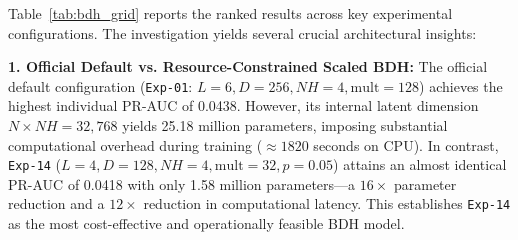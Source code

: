\documentclass[oneside]{ieeeaccess}
\begin{document}
Table~\ref{tab:bdh_grid} reports the ranked results across key experimental configurations. The investigation yields several crucial architectural insights:

\begin{table}[!t]
\caption{Systematic BDH Hyperparameter Grid Exploration Ranked by Test PR-AUC}
\label{tab:bdh_grid}
\centering
{}
\end{table}

\textbf{1. Official Default vs. Resource-Constrained Scaled BDH:} The official default configuration (\texttt{Exp-01}: $L=6, D=256, NH=4, \mathrm{mult}=128$) achieves the highest individual PR-AUC of 0.0438. However, its internal latent dimension $N \times NH = 32,768$ yields 25.18 million parameters, imposing substantial computational overhead during training ($\approx 1820$ seconds on CPU). In contrast, \texttt{Exp-14} ($L=4, D=128, NH=4, \mathrm{mult}=32, p=0.05$) attains an almost identical PR-AUC of 0.0418 with only 1.58 million parameters—a $16\times$ parameter reduction and a $12\times$ reduction in computational latency. This establishes \texttt{Exp-14} as the most cost-effective and operationally feasible BDH model.
\end{document}
